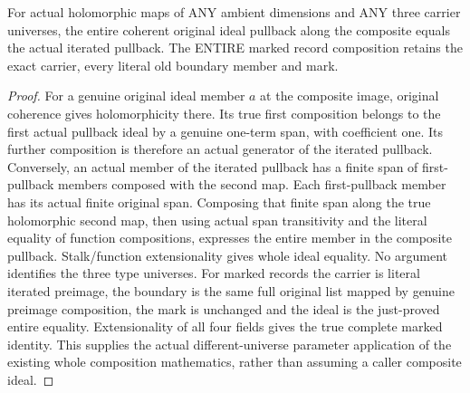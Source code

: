 \begin{lemma}
\label{hir:submersion-contact-param-coeff-cross-universe-composition}
\leanok
For actual holomorphic maps of ANY ambient dimensions and ANY three carrier
universes, the entire coherent original ideal pullback along the composite
equals the actual iterated pullback. The ENTIRE marked record composition
retains the exact carrier, every literal old boundary member and mark.
\end{lemma}
\begin{proof}
For a genuine original ideal member $a$ at the composite image, original
coherence gives holomorphicity there. Its true first composition belongs to
the first actual pullback ideal by a genuine one-term span, with coefficient
one. Its further composition is therefore an actual generator of the
iterated pullback. Conversely, an actual member of the iterated pullback has
a finite span of first-pullback members composed with the second map. Each
first-pullback member has its actual finite original span. Composing that
finite span along the true holomorphic second map, then using actual span
transitivity and the literal equality of function compositions, expresses
the entire member in the composite pullback. Stalk/function extensionality
gives whole ideal equality. No argument identifies the three type universes.
For marked records the carrier is literal iterated preimage, the boundary is
the same full original list mapped by genuine preimage composition, the mark
is unchanged and the ideal is the just-proved entire equality. Extensionality
of all four fields gives the true complete marked identity. This supplies the
actual different-universe parameter application of the existing whole
composition mathematics, rather than assuming a caller composite ideal.
\end{proof}

